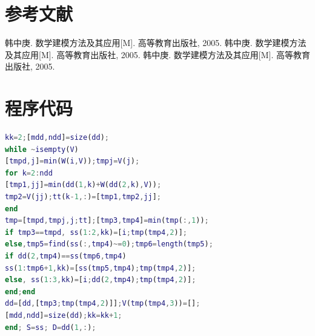\documentclass[bwprint]{gmcmthesis}
\numberwithin{figure}{section}
\begin{document}
\section{参考文献}
\begin{thebibliography}{1.2}%
\setlength{\itemsep}{-2mm}
 韩中庚. 数学建模方法及其应用[M]. 高等教育出版社, 2005.
 韩中庚. 数学建模方法及其应用[M]. 高等教育出版社, 2005.
 韩中庚. 数学建模方法及其应用[M]. 高等教育出版社, 2005.
\end{thebibliography}




\newpage
\appendix
\section{程序代码}
\begin{lstlisting}[language=Matlab] 
kk=2;[mdd,ndd]=size(dd);
while ~isempty(V)
[tmpd,j]=min(W(i,V));tmpj=V(j);
for k=2:ndd
[tmp1,jj]=min(dd(1,k)+W(dd(2,k),V));
tmp2=V(jj);tt(k-1,:)=[tmp1,tmp2,jj];
end
tmp=[tmpd,tmpj,j;tt];[tmp3,tmp4]=min(tmp(:,1));
if tmp3==tmpd, ss(1:2,kk)=[i;tmp(tmp4,2)];
else,tmp5=find(ss(:,tmp4)~=0);tmp6=length(tmp5);
if dd(2,tmp4)==ss(tmp6,tmp4)
ss(1:tmp6+1,kk)=[ss(tmp5,tmp4);tmp(tmp4,2)];
else, ss(1:3,kk)=[i;dd(2,tmp4);tmp(tmp4,2)];
end;end
dd=[dd,[tmp3;tmp(tmp4,2)]];V(tmp(tmp4,3))=[];
[mdd,ndd]=size(dd);kk=kk+1;
end; S=ss; D=dd(1,:);
 \end{lstlisting}
\end{document}

